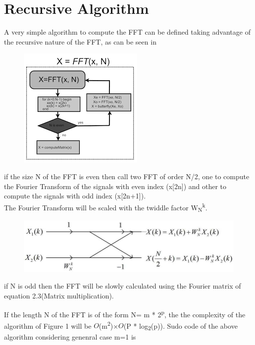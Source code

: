 \documentclass{report}
\begin{document}
\section{Recursive Algorithm}
A very simple algorithm to compute the FFT can be defined taking advantage of the recursive nature of the FFT, as can be seen in\\
\begin{figure}[h]
\includegraphics[scale=0.75]{download1.png}
\centering
\end{figure}
\par
if the size N of the FFT is even then call two FFT of order N/2, one to compute the Fourier Transform of the signals with even index (x[2n]) and other to compute the signals with odd index (x[2n+1]). \\The Fourier Transform will be scaled with the twiddle factor W\textsubscript{N}\textsuperscript{k}.
\begin{figure}[h]
\includegraphics[scale=0.3]{butterfly-operation.png}
\centering
\end{figure}
if N is odd then the FFT will be slowly calculated using the Fourier matrix of equation 2.3(Matrix multiplication).\par
If the length N of the FFT is of the form N= m * 2\textsuperscript{p}, the the complexity of the algorithm of Figure 1 will be $O$(m\textsuperscript{2})×$O$(P * log\textsubscript{2}(p)).
Sudo code of the above algorithm considering genenral case m=1 is 
\end{document}
